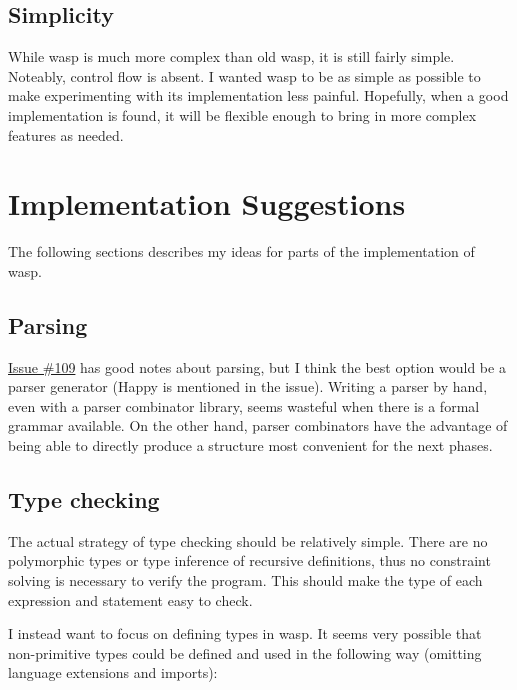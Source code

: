 \subsection{Simplicity}

While wasp is much more complex than old wasp, it is still fairly simple.
Noteably, control flow is absent. I wanted wasp to be as simple as possible
to make experimenting with its implementation less painful. Hopefully, when
a good implementation is found, it will be flexible enough to bring
in more complex features as needed.

\section{Implementation Suggestions}

The following sections describes my ideas for parts of the implementation of
wasp.

\subsection{Parsing}

\href{https://github.com/wasp-lang/wasp/issues/109}{Issue \#109} has good notes
about parsing, but I think the best option would be a parser generator (Happy
is mentioned in the issue). Writing a parser by hand, even with a parser
combinator library, seems wasteful when there is a formal grammar available.
On the other hand, parser combinators have the advantage of being able to
directly produce a structure most convenient for the next phases.

\subsection{Type checking}

The actual strategy of type checking should be relatively simple. There are no
polymorphic types or type inference of recursive definitions, thus no constraint
solving is necessary to verify the program. This should make the type of each
expression and statement easy to check.

I instead want to focus on defining types in wasp. It seems very possible that
non-primitive types could be defined and used in the following way (omitting
language extensions and imports):

